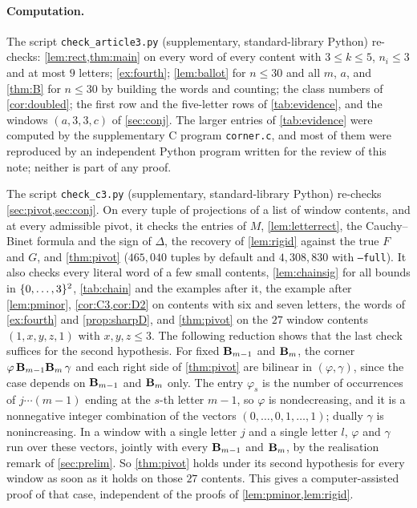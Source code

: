 \documentclass[11pt,a4paper]{article}
\begin{document}
\paragraph{Computation.} The script \texttt{check\_article3.py} (supplementary, standard-library Python) re-checks: \cref{lem:rect,thm:main} on every word of every content with $3\le k\le5$, $n_i\le3$ and at most $9$ letters; \cref{ex:fourth}; \cref{lem:ballot} for $n\le30$ and all $m$, $a$, and \cref{thm:B} for $n\le30$ by building the words and counting; the class numbers of \cref{cor:doubled}; the first row and the five-letter rows of \cref{tab:evidence}, and the windows $(a,3,3,c)$ of \cref{sec:conj}. The larger entries of \cref{tab:evidence} were computed by the supplementary C program \texttt{corner.c}, and most of them were reproduced by an independent Python program written for the review of this note; neither is part of any proof.

The script \texttt{check\_c3.py} (supplementary, standard-library Python) re-checks \cref{sec:pivot,sec:conj}. On every tuple of projections of a list of window contents, and at every admissible pivot, it checks the entries of $M$, \cref{lem:letterrect}, the Cauchy--Binet formula and the sign of $\Delta$, the recovery of \cref{lem:rigid} against the true $F$ and $G$, and \cref{thm:pivot} ($465{,}040$ tuples by default and $4{,}308{,}830$ with \texttt{--full}). It also checks every literal word of a few small contents, \cref{lem:chainsig} for all bounds in $\{0,\ldots,3\}^2$, \cref{tab:chain} and the examples after it, the example after \cref{lem:pminor}, \cref{cor:C3,cor:D2} on contents with six and seven letters, the words of \cref{ex:fourth} and \cref{prop:sharpD}, and \cref{thm:pivot} on the $27$ window contents $(1,x,y,z,1)$ with $x,y,z\le3$. The following reduction shows that the last check suffices for the second hypothesis. For fixed $\mathbf{B}_{m-1}$ and $\mathbf{B}_{m}$, the corner $\varphi\,\mathbf{B}_{m-1}\mathbf{B}_{m}\,\gamma$ and each right side of \cref{thm:pivot} are bilinear in $(\varphi,\gamma)$, since the case depends on $\mathbf{B}_{m-1}$ and $\mathbf{B}_{m}$ only. The entry $\varphi_s$ is the number of occurrences of $j\cdots(m-1)$ ending at the $s$-th letter $m-1$, so $\varphi$ is nondecreasing, and it is a nonnegative integer combination of the vectors $(0,\dots,0,1,\dots,1)$; dually $\gamma$ is nonincreasing. In a window with a single letter $j$ and a single letter $l$, $\varphi$ and $\gamma$ run over these vectors, jointly with every $\mathbf{B}_{m-1}$ and $\mathbf{B}_{m}$, by the realisation remark of \cref{sec:prelim}. So \cref{thm:pivot} holds under its second hypothesis for every window as soon as it holds on those $27$ contents. This gives a computer-assisted proof of that case, independent of the proofs of \cref{lem:pminor,lem:rigid}.
\end{document}
